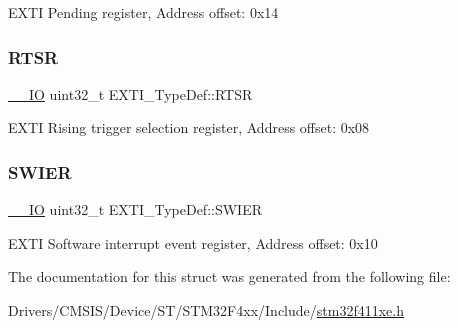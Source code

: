 E\+X\+TI Pending register, Address offset\+: 0x14 \mbox{\label{struct_e_x_t_i___type_def_ac019d211d8c880b327a1b90a06cc0675}} 
\subsubsection{\texorpdfstring{R\+T\+SR}{RTSR}}
{\footnotesize\ttfamily \hyperlink{core__sc300_8h_aec43007d9998a0a0e01faede4133d6be}{\+\_\+\+\_\+\+IO} uint32\+\_\+t E\+X\+T\+I\+\_\+\+Type\+Def\+::\+R\+T\+SR}

E\+X\+TI Rising trigger selection register, Address offset\+: 0x08 \mbox{\label{struct_e_x_t_i___type_def_a5c1f538e64ee90918cd158b808f5d4de}} 
\subsubsection{\texorpdfstring{S\+W\+I\+ER}{SWIER}}
{\footnotesize\ttfamily \hyperlink{core__sc300_8h_aec43007d9998a0a0e01faede4133d6be}{\+\_\+\+\_\+\+IO} uint32\+\_\+t E\+X\+T\+I\+\_\+\+Type\+Def\+::\+S\+W\+I\+ER}

E\+X\+TI Software interrupt event register, Address offset\+: 0x10 

The documentation for this struct was generated from the following file\+:\begin{DoxyCompactItemize}
\item 
Drivers/\+C\+M\+S\+I\+S/\+Device/\+S\+T/\+S\+T\+M32\+F4xx/\+Include/\hyperlink{stm32f411xe_8h}{stm32f411xe.\+h}\end{DoxyCompactItemize}
